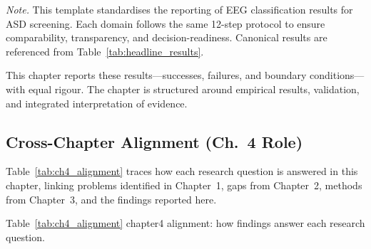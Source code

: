 \vspace{2pt}
\noindent\textit{Note.} This template standardises the reporting of EEG classification results for ASD screening. Each domain follows the same 12-step protocol to ensure comparability, transparency, and decision-readiness. Canonical results are referenced from Table~\ref{tab:headline_results}.
\fi %
\fi %

\noindent This chapter reports these results---successes, failures, and boundary conditions---with equal rigour. The chapter is structured around empirical results, validation, and integrated interpretation of evidence.

\subsection{Cross-Chapter Alignment (Ch.~4 Role)}

Table~\ref{tab:ch4_alignment} traces how each research question is answered in this chapter, linking problems identified in Chapter~1, gaps from Chapter~2, methods from Chapter~3, and the findings reported here.

\iffalse %
\begingroup\singlespacing\scriptsize\tablefontsize
\noindent Table~\ref{tab:ch4_alignment} chapter4 alignment: how findings answer each research question.

